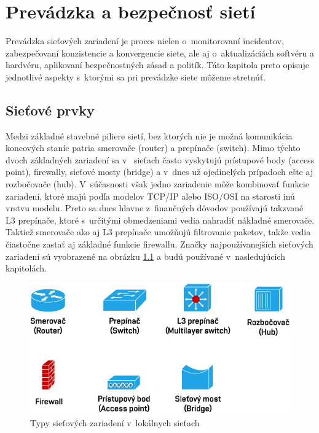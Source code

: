 \chapter{Prevádzka a bezpečnosť sietí}
Prevádzka sieťových zariadení je proces nielen o~monitorovaní incidentov, zabezpečovaní konzistencie a konvergencie siete, ale aj o~aktualizáciách softvéru a hardvéru, aplikovaní bezpečnostných zásad a politík. Táto kapitola preto opisuje jednotlivé aspekty s~ktorými sa pri prevádzke siete môžeme stretnúť.

\section{Sieťové prvky}
\label{hierarchicky-model}
Medzi základné stavebné piliere sietí, bez ktorých nie je možná komunikácia koncových staníc patria smerovače (router) a prepínače (switch). Mimo týchto dvoch základných zariadení sa v~ sieťach často vyskytujú prístupové body (access point), firewally, sieťové mosty (bridge) a v~dnes už ojedinelých prípadoch ešte aj rozbočovače (hub). V~súčasnosti však jedno zariadenie môže kombinovať funkcie zariadení, ktoré majú podľa modelov TCP/IP alebo ISO/OSI na starosti inú vrstvu modelu. Preto sa dnes hlavne z~finančných dôvodov používajú takzvané L3 prepínače, ktoré s~určitými obmedzeniami vedia nahradiť nákladné smerovače. Taktiež smerovače ako aj L3 prepínače umožňujú filtrovanie paketov, takže vedia čiastočne zastať aj základné funkcie firewallu. Značky najpoužívanejších sieťových zariadení sú vyobrazené na obrázku \ref{fig:net-devices} a budú používané v~nasledujúcich kapitolách.

\begin{figure}[H]
	\begin{center}
		\includegraphics[scale=1.2]{obrazky/net_devices.pdf}
	\end{center}
	\caption[Typy sieťových zariadení v~lokálnych sieťach]{Typy sieťových zariadení v~lokálnych sieťach}
	\label{fig:net-devices}
\end{figure} 

